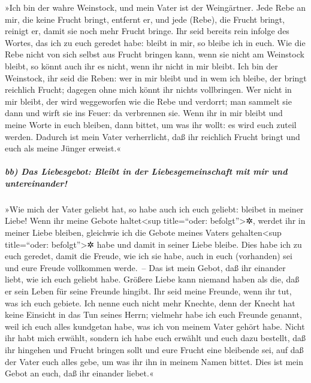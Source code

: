  »Ich bin der wahre Weinstock, und mein Vater ist der
Weingärtner.  Jede Rebe an mir, die keine Frucht bringt,
entfernt er, und jede (Rebe), die Frucht bringt, reinigt er, damit sie
noch mehr Frucht bringe.  Ihr seid bereits rein infolge
des Wortes, das ich zu euch geredet habe:  bleibt in mir,
so bleibe ich in euch. Wie die Rebe nicht von sich selbst aus Frucht
bringen kann, wenn sie nicht am Weinstock bleibt, so könnt auch ihr es
nicht, wenn ihr nicht in mir bleibt.  Ich bin der
Weinstock, ihr seid die Reben: wer in mir bleibt und in wem ich bleibe,
der bringt reichlich Frucht; dagegen ohne mich könnt ihr nichts
vollbringen.  Wer nicht in mir bleibt, der wird
weggeworfen wie die Rebe und verdorrt; man sammelt sie dann und wirft
sie ins Feuer: da verbrennen sie.  Wenn ihr in mir bleibt
und meine Worte in euch bleiben, dann bittet, um was ihr wollt: es wird
euch zuteil werden.  Dadurch ist mein Vater verherrlicht,
daß ihr reichlich Frucht bringt und euch als meine Jünger erweist.«

\hypertarget{bb-das-liebesgebot-bleibt-in-der-liebesgemeinschaft-mit-mir-und-untereinander}{%
\subparagraph{bb) Das Liebesgebot: Bleibt in der Liebesgemeinschaft mit
mir und
untereinander!}\label{bb-das-liebesgebot-bleibt-in-der-liebesgemeinschaft-mit-mir-und-untereinander}}

 »Wie mich der Vater geliebt hat, so habe auch ich euch
geliebt: bleibet in meiner Liebe!  Wenn ihr meine Gebote
haltet\textless sup title=``oder: befolgt''\textgreater✲, werdet ihr in
meiner Liebe bleiben, gleichwie ich die Gebote meines Vaters
gehalten\textless sup title=``oder: befolgt''\textgreater✲ habe und
damit in seiner Liebe bleibe.  Dies habe ich zu euch
geredet, damit die Freude, wie ich sie habe, auch in euch (vorhanden)
sei und eure Freude vollkommen werde.~--  Das ist mein
Gebot, daß ihr einander liebt, wie ich euch geliebt habe.
 Größere Liebe kann niemand haben als die, daß er sein
Leben für seine Freunde hingibt.  Ihr seid meine Freunde,
wenn ihr tut, was ich euch gebiete.  Ich nenne euch nicht
mehr Knechte, denn der Knecht hat keine Einsicht in das Tun seines
Herrn; vielmehr habe ich euch Freunde genannt, weil ich euch alles
kundgetan habe, was ich von meinem Vater gehört habe. 
Nicht ihr habt mich erwählt, sondern ich habe euch erwählt und euch dazu
bestellt, daß ihr hingehen und Frucht bringen sollt und eure Frucht eine
bleibende sei, auf daß der Vater euch alles gebe, um was ihr ihn in
meinem Namen bittet.  Dies ist mein Gebot an euch, daß
ihr einander liebet.«


